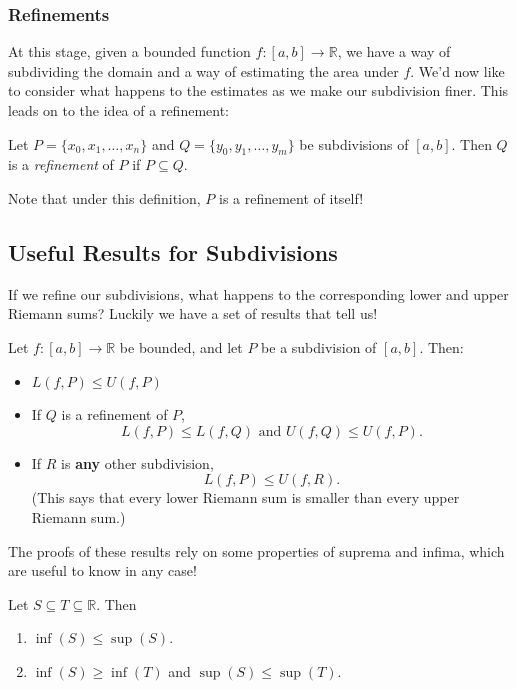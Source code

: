 \documentclass[
  12pt,
  a4paper]{extarticle}
\providecommand{\tightlist}{%
  \setlength{\itemsep}{0pt}\setlength{\parskip}{0pt}}
\theoremstyle{plain}
\theoremstyle{definition}
\theoremstyle{plain}
\theoremstyle{plain}
\theoremstyle{plain}
\theoremstyle{plain}
\theoremstyle{definition}
\theoremstyle{definition}
\theoremstyle{remark}
\theoremstyle{remark}
\let\BeginKnitrBlock\begin \let\EndKnitrBlock\end
\renewcommand{\;}{\,}
\begin{document}
\hypertarget{refinements}{%
\subsubsection{Refinements}\label{refinements}}

At this stage, given a bounded function \(f:[a,b] \to \mathbb{R}\), we have a way of subdividing the domain and a way of estimating the area under \(f\). We'd now like to consider what happens to the estimates as we make our subdivision finer. This leads on to the idea of a refinement:

\BeginKnitrBlock{definition}[Refinement]
{\label{def:def4} }Let \(P = \lbrace x_0, x_1, \ldots, x_n \rbrace\) and \(Q = \lbrace y_0, y_1, \ldots, y_m \rbrace\) be subdivisions of \([a,b].\) Then \(Q\) is a \emph{refinement} of \(P\) if \(P\subseteq Q\).
\EndKnitrBlock{definition}
Note that under this definition, \(P\) is a refinement of itself!

\hypertarget{useful-results-for-subdivisions}{%
\subsection{Useful Results for Subdivisions}\label{useful-results-for-subdivisions}}

If we refine our subdivisions, what happens to the corresponding lower and upper Riemann sums? Luckily we have a set of results that tell us!

\BeginKnitrBlock{proposition}
{\label{prp:prop1} }Let \(f:[a,b] \to \mathbb{R}\) be bounded, and let \(P\) be a subdivision of \([a,b].\) Then:

\begin{itemize}
\tightlist
\item
  \(L(f,P) \leq U(f,P)\)
\item
  If \(Q\) is a refinement of \(P\), \[L(f,P) \leq L(f,Q)\;\; \text{and} \;\; U(f,Q) \leq U(f,P).\]
\item
  If \(R\) is \textbf{any} other subdivision, \[L(f,P) \leq U(f,R).\] (This says that every lower Riemann sum is smaller than every upper Riemann sum.)
\end{itemize}
\EndKnitrBlock{proposition}

The proofs of these results rely on some properties of suprema and infima, which are useful to know in any case!

\BeginKnitrBlock{proposition}
{\label{prp:prop2} }
Let \(S \subseteq T \subseteq \mathbb{R}\). Then

\begin{enumerate}
\def\labelenumi{\arabic{enumi}.}
\tightlist
\item
  \(\inf(S) \leq \sup(S).\)
\item
  \(\inf(S) \geq \inf(T)\) and \(\sup(S) \leq \sup(T).\)
\end{enumerate}
\EndKnitrBlock{proposition}
\end{document}
